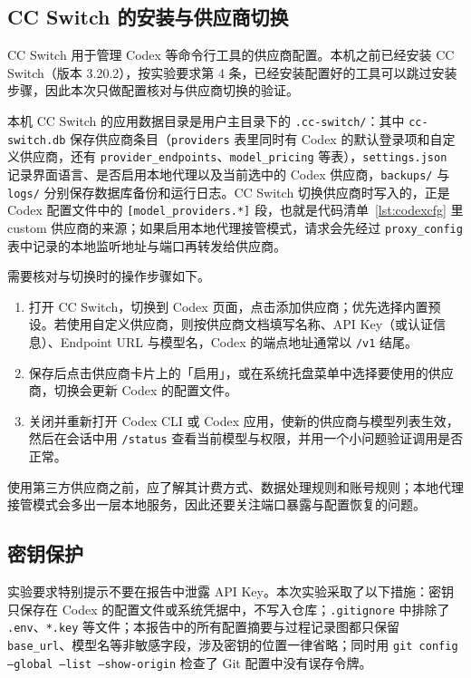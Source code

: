 \documentclass{SYSUReport}
\begin{document}
\subsection{CC Switch 的安装与供应商切换}

CC Switch 用于管理 Codex 等命令行工具的供应商配置。本机之前已经安装 CC Switch（版本 3.20.2），按实验要求第 4 条，已经安装配置好的工具可以跳过安装步骤，因此本次只做配置核对与供应商切换的验证。

本机 CC Switch 的应用数据目录是用户主目录下的 \texttt{.cc-switch/}：其中 \texttt{cc-switch.db} 保存供应商条目（\texttt{providers} 表里同时有 Codex 的默认登录项和自定义供应商，还有 \texttt{provider\_endpoints}、\texttt{model\_pricing} 等表），\texttt{settings.json} 记录界面语言、是否启用本地代理以及当前选中的 Codex 供应商，\texttt{backups/} 与 \texttt{logs/} 分别保存数据库备份和运行日志。CC Switch 切换供应商时写入的，正是 Codex 配置文件中的 \texttt{[model\_providers.*]} 段，也就是代码清单~\ref{lst:codexcfg} 里 custom 供应商的来源；如果启用本地代理接管模式，请求会先经过 \texttt{proxy\_config} 表中记录的本地监听地址与端口再转发给供应商。

需要核对与切换时的操作步骤如下。

\begin{enumerate}
    \item 打开 CC Switch，切换到 Codex 页面，点击添加供应商；优先选择内置预设。若使用自定义供应商，则按供应商文档填写名称、API Key（或认证信息）、Endpoint URL 与模型名，Codex 的端点地址通常以 \texttt{/v1} 结尾。
    \item 保存后点击供应商卡片上的「启用」，或在系统托盘菜单中选择要使用的供应商，切换会更新 Codex 的配置文件。
    \item 关闭并重新打开 Codex CLI 或 Codex 应用，使新的供应商与模型列表生效，然后在会话中用 \texttt{/status} 查看当前模型与权限，并用一个小问题验证调用是否正常。
\end{enumerate}

使用第三方供应商之前，应了解其计费方式、数据处理规则和账号规则；本地代理接管模式会多出一层本地服务，因此还要关注端口暴露与配置恢复的问题。

\subsection{密钥保护}

实验要求特别提示不要在报告中泄露 API Key。本次实验采取了以下措施：密钥只保存在 Codex 的配置文件或系统凭据中，不写入仓库；\texttt{.gitignore} 中排除了 \texttt{.env}、\texttt{*.key} 等文件；本报告中的所有配置摘要与过程记录图都只保留 \texttt{base\_url}、模型名等非敏感字段，涉及密钥的位置一律省略；同时用 \texttt{git config --global --list --show-origin} 检查了 Git 配置中没有误存令牌。
\end{document}
